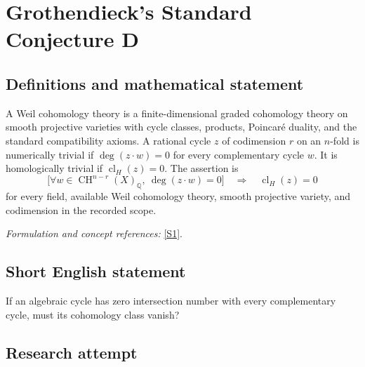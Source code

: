 \documentclass[11pt,a4paper]{article}
\newcommand{\Q}{\mathbb{Q}}
\newcommand{\sref}[2]{\hyperlink{source:#1:#2}{[S#2]}}
\newif\ifshowcatalogue
\newcommand{\cataloguescope}[1]{\ifshowcatalogue
 \paragraph{Exact scope in the supplied catalogue.}
 \begin{quote}\small #1\end{quote}\fi}
\numberwithin{equation}{section}
\begin{document}
\setcounter{section}{0}
\clearpage
\section*{\texorpdfstring{Grothendieck's Standard Conjecture D}{Grothendieck's Standard Conjecture D}}\label{statement}
\subsection{Definitions and mathematical statement}
A Weil cohomology theory is a finite-dimensional graded cohomology theory on smooth projective varieties with cycle classes, products, Poincaré duality, and the standard compatibility axioms. A rational cycle $z$ of codimension $r$ on an $n$-fold is numerically trivial if $\deg(z\cdot w)=0$ for every complementary cycle $w$. It is homologically trivial if $\operatorname{cl}_H(z)=0$. The assertion is
\[
 \bigl[\forall w\in\operatorname{CH}^{n-r}(X)_{\Q},\ \deg(z\cdot w)=0\bigr]
 \quad\Longrightarrow\quad \operatorname{cl}_H(z)=0
\]
for every field, available Weil cohomology theory, smooth projective variety, and codimension in the recorded scope.
\par\smallskip\textit{Formulation and concept references:} \sref{statement}{1}.
\cataloguescope{For every field k, every Weil cohomology theory H* available over k, every smooth projective k-variety X of pure dimension n, every integer r with 0<=r<=n, and every rational algebraic cycle z of codimension r on X, if deg(z.w)=0 for every rational algebraic cycle w of codimension n-r on X, then the H* cycle class of z is zero. Equivalently, numerical and H*-homological equivalence of rational algebraic cycles agree in every codimension.}
\subsection{Short English statement}
If an algebraic cycle has zero intersection number with every complementary cycle, must its cohomology class vanish?
\subsection{Research attempt}
\end{document}
